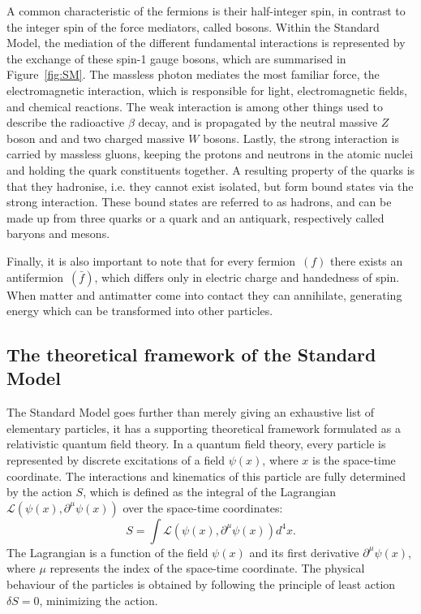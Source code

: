 A common characteristic of the fermions is their half-integer spin, in contrast to the integer spin of the force mediators, called bosons. Within the Standard Model, the mediation of the different fundamental interactions is represented by the exchange of these spin-1 gauge bosons, which are summarised in Figure~\ref{fig:SM}. The massless photon mediates the most familiar force, the electromagnetic interaction, which is responsible for light, electromagnetic fields, and chemical reactions. The weak interaction is among other things used to describe the radioactive $\beta$ decay, and is propagated by the neutral massive $Z$ boson and and two charged massive $W$ bosons. Lastly, the strong interaction is carried by massless gluons, keeping the protons and neutrons in the atomic nuclei and holding the quark constituents together. A resulting property of the quarks is that they hadronise, i.e. they cannot exist isolated, but form bound states via the strong interaction. These bound states are referred to as hadrons, and can be made up from three quarks or a quark and an antiquark, respectively called baryons and mesons.

Finally, it is also important to note that for every fermion~$(f)$ there exists an antifermion~$(\bar{f})$, which differs only in electric charge and handedness of spin. When matter and antimatter come into contact they can annihilate, generating energy which can be transformed into other particles.

\subsection{The theoretical framework of the Standard Model}

The Standard Model goes further than merely giving an exhaustive list of elementary particles, it has a supporting theoretical framework formulated as a relativistic quantum field theory. In a quantum field theory, every particle is represented by discrete excitations of a field $\psi(x)$, where $x$ is the space-time coordinate. The interactions and kinematics of this particle are fully determined by the action $S$, which is defined as the integral of the Lagrangian  $\mathcal{L}(\psi(x), \partial^{\mu}\psi(x))$ over the space-time coordinates:
\begin{equation}
 S = \int\mathcal{L}(\psi(x), \partial^{\mu}\psi(x))d^4x.
\end{equation}
The Lagrangian  is a function of the field $\psi(x)$ and its first derivative $\partial^{\mu}\psi(x)$, where $\mu$ represents the index of the space-time coordinate. The physical behaviour of the particles is obtained by following the principle of least action $\delta S =0$, minimizing the action.

